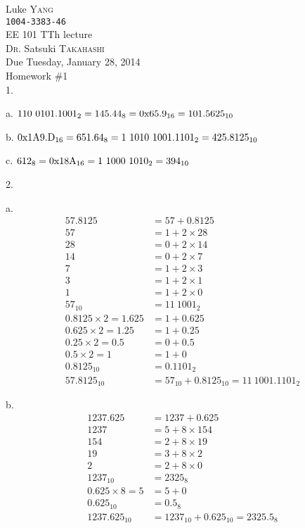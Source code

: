 \documentclass[UTF8,12pt,letterpaper,oneside]{amsart}
\begin{document}
\noindent Luke \textsc{Yang}\\
\texttt{1004-3383-46}\\
EE 101 TTh lecture\\
\textsc{Dr.} Satsuki \textsc{Takahashi}\\
Due Tuesday, January 28, 2014\\
Homework \#1\\

1.

a. $\rm 110\ 0101.1001_2 = 145.44_8 = 0x65.9_{16} = 101.5625_{10}$ 

b. $\rm 0x1A9.D_{16} = 651.64_8 = 1\ 1010\ 1001.1101_2 = 425.8125_{10}$

c. $\rm 612_8 = 0x18A_{16} = 1\ 1000\ 1010_2 = 394_{10}$

2.

a. \begin{equation*}\begin{split}
57.8125 &= 57 + 0.8125\\
57 &= 1 + 2 \times 28\\
28 &= 0 + 2 \times 14\\
14 &= 0 + 2 \times  7\\
 7 &= 1 + 2 \times  3\\
 3 &= 1 + 2 \times  1\\
 1 &= 1 + 2 \times  0\\
57_{10} &= 11\ 1001_2\\ 
0.8125 \times 2 = 1.625 &= 1 + 0.625\\
0.625  \times 2 = 1.25  &= 1 + 0.25\\
0.25   \times 2 = 0.5   &= 0 + 0.5\\
0.5    \times 2 = 1     &= 1 + 0\\
0.8125_{10} &= 0.1101_2\\
57.8125_{10} &= 57_{10} + 0.8125_{10} = 11\ 1001.1101_2
\end{split}\end{equation*}

b. \begin{equation*}\begin{split}
1237.625 &= 1237 + 0.625\\
1237 &= 5 + 8 \times 154\\
 154 &= 2 + 8 \times 19\\
  19 &= 3 + 8 \times 2\\
   2 &= 2 + 8 \times 0\\
1237_{10} &= 2325_8\\   
0.625 \times 8 = 5 &= 5 + 0\\
0.625_{10} &= 0.5_8\\
1237.625_{10} &= 1237_{10} + 0.625_{10} = 2325.5_8
\end{split}\end{equation*}
\end{document}
